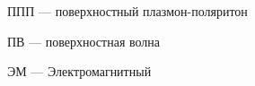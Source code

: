 \documentclass[times]{itmo-student-thesis}
\begin{document}




%
%
%

\tableofcontents



\noindent ППП --- поверхностный плазмон-поляритон

\noindent ПВ --- поверхностная волна

\noindent ЭМ --- Электромагнитный












\printmainbibliography


\end{document}

